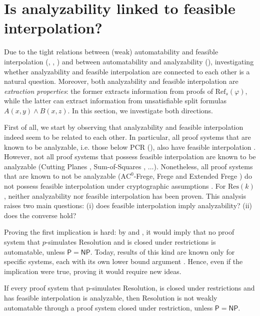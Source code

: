 \section{Is analyzability linked to feasible interpolation?}
\label{sec:fis_an}

Due to the tight relations between (weak) automatability and feasible interpolation (, , ) and between automatability and analyzability (), investigating whether analyzability and feasible interpolation are connected to each other is a natural question. Moreover, both analyzability and feasible interpolation are \textit{extraction properties}: the former extracts information from proofs of $\mathrm{Ref}_s(\varphi)$, while the latter can extract information from unsatisfiable split formulas $A(x,y) \land B(x,z)$. In this section, we investigate both directions.

First of all, we start by observing that analyzability and feasible interpolation indeed seem to be related to each other. In particular, all proof systems that are known to be analyzable, i.e. those below $\mathrm{PCR}$ (), also have feasible interpolation \cite{kraj_fi, hak_fi}. However, not all proof systems that possess feasible interpolation are known to be analyzable (Cutting Planes \cite{pud_fi}, Sum-of-Squares \cite{hak_fi}, $\ldots$). Nonetheless, all proof systems that are known to not be analyzable ($\mathrm{AC}^0$-Frege, Frege and Extended Frege \cite{pap, pap_2}) do not possess feasible interpolation under cryptographic assumptions \cite{kraj_fi,no_fis_int,fis_int_weak_aut,ac0_crypto}. For $\mathrm{Res}(k)$, neither analyzability nor feasible interpolation has been proven. This analysis raises two main questions: (i) does feasible interpolation imply analyzability? (ii) does the converse hold?

Proving the first implication is hard: by  and , it would imply that no proof system that $p$-simulates Resolution and is closed under restrictions is automatable, unless $\mathsf{P} = \mathsf{NP}$. Today, results of this kind are known only for specific systems, each with its own lower bound argument \cite{res_nphard,alg_nphard,cp_nphard,ac0f_nphard}. Hence, even if the implication were true, proving it would require new ideas.

\begin{proposition}
    If every proof system that p-simulates Resolution, is closed under restrictions and has feasible interpolation is analyzable, then Resolution is not weakly automatable through a proof system closed under restriction, unless $\mathsf{P} = \mathsf{NP}$.
\end{proposition}

